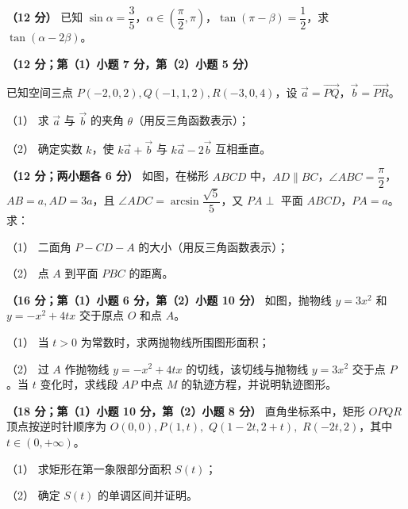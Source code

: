 \begin{question}
\textbf{（12 分）} 已知 \(\sin\alpha=\dfrac35\)，\(\alpha\in(\dfrac\pi2,\pi)\)，\(\tan(\pi-\beta)=\dfrac12\)，求 \(\tan(\alpha-2\beta)\)。

\end{question}
\begin{question}
\textbf{（12 分；第（1）小题 7 分，第（2）小题 5 分）}

已知空间三点 \(P(-2,0,2),Q(-1,1,2),R(-3,0,4)\)，设 \(\vec a=\overrightarrow{PQ}\)，\(\vec b=\overrightarrow{PR}\)。

（1） 求 \(\vec a\) 与 \(\vec b\) 的夹角 \(\theta\)（用反三角函数表示）；

（2） 确定实数 \(k\)，使 \(k\vec a+\vec b\) 与 \(k\vec a-2\vec b\) 互相垂直。

\Needspace{0.4\textheight}
\end{question}
\begin{question}
\textbf{（12 分；两小题各 6 分）} 如图，在梯形 \(ABCD\) 中，\(AD\parallel BC\)，\(\angle ABC=\dfrac\pi2\)，\(AB=a,AD=3a\)，且 \(\angle ADC=\arcsin\dfrac{\sqrt5}{5}\)，又 \(PA\perp\) 平面 \(ABCD\)，\(PA=a\)。求：

（1） 二面角 \(P-CD-A\) 的大小（用反三角函数表示）；

（2） 点 \(A\) 到平面 \(PBC\) 的距离。
\nopagebreak[4]
\begin{center}\end{center}
\nopagebreak[4]
\Needspace{0.4\textheight}
\end{question}
\begin{question}
\textbf{（16 分；第（1）小题 6 分，第（2）小题 10 分）} 如图，抛物线 \(y=3x^2\) 和 \(y=-x^2+4tx\) 交于原点 \(O\) 和点 \(A\)。

（1） 当 \(t>0\) 为常数时，求两抛物线所围图形面积；

（2） 过 \(A\) 作抛物线 \(y=-x^2+4tx\) 的切线，该切线与抛物线 \(y=3x^2\) 交于点 \(P\)。当 \(t\) 变化时，求线段 \(AP\) 中点 \(M\) 的轨迹方程，并说明轨迹图形。
\nopagebreak[4]
\begin{center}\end{center}
\nopagebreak[4]
\end{question}
\begin{question}
\textbf{（18 分；第（1）小题 10 分，第（2）小题 8 分）} 直角坐标系中，矩形 \(OPQR\) 顶点按逆时针顺序为 \(O(0,0),P(1,t),\) \mbox{\(Q(1-2t,2+t),\)} \(R(-2t,2)\)，其中 \(t\in(0,+\infty)\)。

（1） 求矩形在第一象限部分面积 \(S(t)\)；

（2） 确定 \(S(t)\) 的单调区间并证明。

\end{question}
